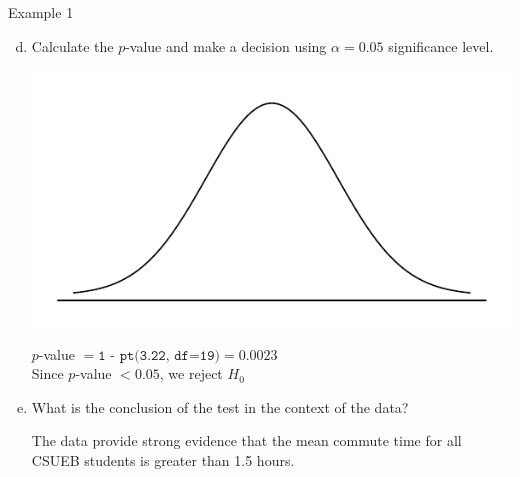 \documentclass[fleqn, 10pt]{beamer}\usepackage[]{graphicx}\usepackage[]{color}
\begin{document}
\begin{frame}{Example 1}
\begin{enumerate}[(a)]
\setcounter{enumi}{3}
\item Calculate the $p$-value and make a decision using $\alpha = 0.05$ significance level.

\smallskip
\begin{multicols}{2}
\includegraphics[scale=0.35]{figure/norm_draw.pdf}
\vspace{0.75cm}
\columnbreak

{\color{blue}$p$-value $= \texttt{1 - pt(3.22, df=19)} = 0.0023$\\
Since $p$-value $<0.05$, we reject $H_0$}
\end{multicols}


\item What is the conclusion of the test in the context of the data?

\medskip
{\color{blue} The data provide strong evidence that the mean commute time for all CSUEB students is greater than 1.5 hours.}
\end{enumerate}
\end{frame}

\begin{frame}
\end{frame}
\end{document}
